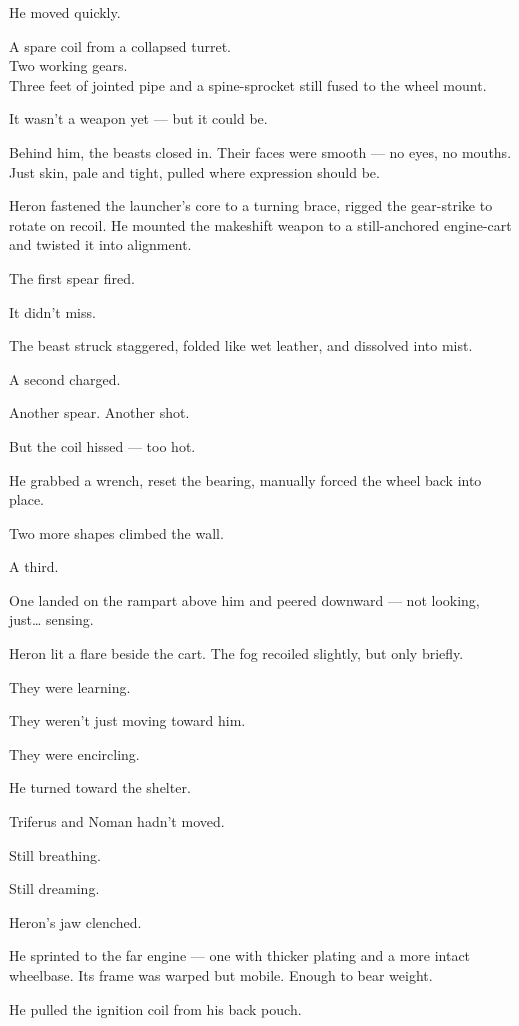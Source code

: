 \documentclass[9pt]{article}
\begin{document}
He moved quickly.

A spare coil from a collapsed turret. \\
Two working gears. \\
Three feet of jointed pipe and a spine-sprocket still fused to the wheel mount.

It wasn’t a weapon yet — but it could be.

Behind him, the beasts closed in. Their faces were smooth — no eyes, no mouths. Just skin, pale and tight, pulled where expression should be.

Heron fastened the launcher’s core to a turning brace, rigged the gear-strike to rotate on recoil. He mounted the makeshift weapon to a still-anchored engine-cart and twisted it into alignment.

The first spear fired.

It didn’t miss.

The beast struck staggered, folded like wet leather, and dissolved into mist.

A second charged.

Another spear. Another shot.

But the coil hissed — too hot.

He grabbed a wrench, reset the bearing, manually forced the wheel back into place.

Two more shapes climbed the wall.

A third.

One landed on the rampart above him and peered downward — not looking, just… sensing.

Heron lit a flare beside the cart. The fog recoiled slightly, but only briefly.

They were learning.

They weren’t just moving toward him.

They were encircling.

\bigskip

He turned toward the shelter.

Triferus and Noman hadn’t moved.

Still breathing.

Still dreaming.

Heron’s jaw clenched.

He sprinted to the far engine — one with thicker plating and a more intact wheelbase. Its frame was warped but mobile. Enough to bear weight.

He pulled the ignition coil from his back pouch.
\end{document}
